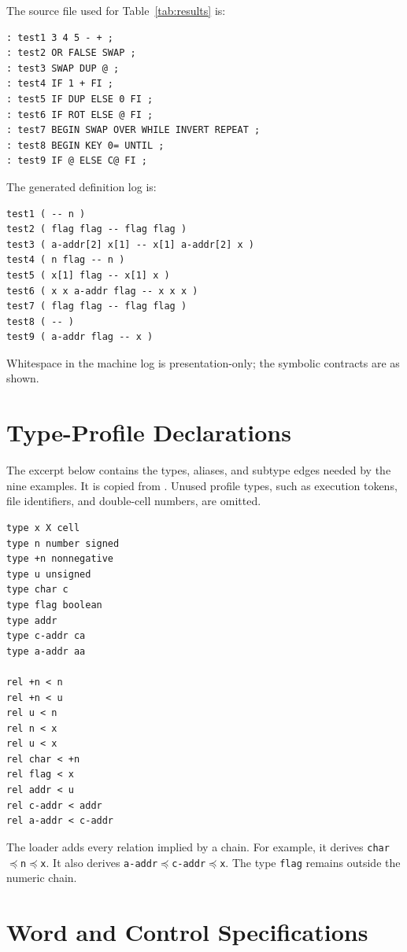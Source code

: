 \documentclass[11pt,a4paper]{article}
\begin{document}
\begin{samepage}
The source file used for Table~\ref{tab:results} is:
\begin{verbatim}
: test1 3 4 5 - + ;
: test2 OR FALSE SWAP ;
: test3 SWAP DUP @ ;
: test4 IF 1 + FI ;
: test5 IF DUP ELSE 0 FI ;
: test6 IF ROT ELSE @ FI ;
: test7 BEGIN SWAP OVER WHILE INVERT REPEAT ;
: test8 BEGIN KEY 0= UNTIL ;
: test9 IF @ ELSE C@ FI ;
\end{verbatim}
\end{samepage}
\begin{samepage}
The generated definition log is:
\begin{verbatim}
test1 ( -- n )
test2 ( flag flag -- flag flag )
test3 ( a-addr[2] x[1] -- x[1] a-addr[2] x )
test4 ( n flag -- n )
test5 ( x[1] flag -- x[1] x )
test6 ( x x a-addr flag -- x x x )
test7 ( flag flag -- flag flag )
test8 ( -- )
test9 ( a-addr flag -- x )
\end{verbatim}
Whitespace in the machine log is presentation-only; the symbolic contracts are
as shown.
\end{samepage}

\section{Type-Profile Declarations}
\label{app:types}

The excerpt below contains the types, aliases, and subtype edges needed by the
nine examples.  It is copied from .  Unused profile
types, such as execution tokens, file identifiers, and double-cell numbers,
are omitted.
\begin{verbatim}
type x X cell
type n number signed
type +n nonnegative
type u unsigned
type char c
type flag boolean
type addr
type c-addr ca
type a-addr aa

rel +n < n
rel +n < u
rel u < n
rel n < x
rel u < x
rel char < +n
rel flag < x
rel addr < u
rel c-addr < addr
rel a-addr < c-addr
\end{verbatim}
The loader adds every relation implied by a chain.  For example, it derives
\texttt{char}$\preceq$\texttt{n}$\preceq$\texttt{x}.  It also derives
\texttt{a-addr}$\preceq$\texttt{c-addr}$\preceq$\texttt{x}.
The type \texttt{flag} remains outside the numeric chain.

\section{Word and Control Specifications}
\label{app:specs}
\end{document}
